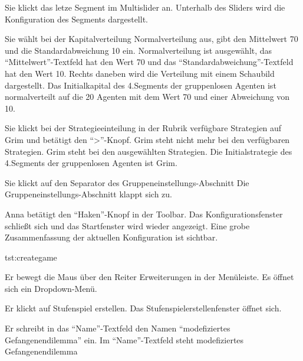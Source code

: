 \documentclass[parskip=full,11pt]{scrartcl}
\begin{document}
{Sie klickt das letze Segment im Multislider an.}
{Unterhalb des Sliders wird die Konfiguration des Segments dargestellt.}

{Sie wählt bei der Kapitalverteilung Normalverteilung aus, gibt den Mittelwert 70 und die Standardabweichung 10 ein.}
{Normalverteilung ist ausgewählt, das \enquote{Mittelwert}-Textfeld hat den Wert 70 und das \enquote{Standardabweichung}-Textfeld hat den Wert 10. Rechts daneben wird die Verteilung mit einem Schaubild dargestellt. Das Initialkapital des 4.Segments der gruppenlosen Agenten ist normalverteilt auf die 20 Agenten mit dem Wert 70 und einer Abweichung von 10.}

{Sie klickt bei der Strategieeinteilung in der Rubrik verfügbare Strategien auf Grim und betätigt den \enquote{>}-Knopf.}
{Grim steht nicht mehr bei den verfügbaren Strategien. Grim steht bei den ausgewählten Strategien. Die Initialstrategie des 4.Segments der gruppenlosen Agenten ist Grim.}

{Sie klickt auf den Separator des Gruppeneinstellungs-Abschnitt}
{Die Gruppeneinstellungs-Abschnitt klappt sich zu.}

{Anna betätigt den \enquote{Haken}-Knopf in der Toolbar.}
{Das Konfigurationsfenster schließt sich und das Startfenster wird wieder angezeigt. Eine grobe Zusammenfassung der aktuellen Konfiguration ist sichtbar.}

{tst:creategame}

{Er bewegt die Maus über den Reiter Erweiterungen in der Menüleiste.}
{Es öffnet sich ein Dropdown-Menü.}

{Er klickt auf Stufenspiel erstellen.}
{Das Stufenspielerstellenfenster öffnet sich.}

{Er schreibt in das \enquote{Name}-Textfeld den Namen \enquote{modefiziertes Gefangenendilemma} ein.}
{Im \enquote{Name}-Textfeld steht modefiziertes Gefangenendilemma}
\end{document}
